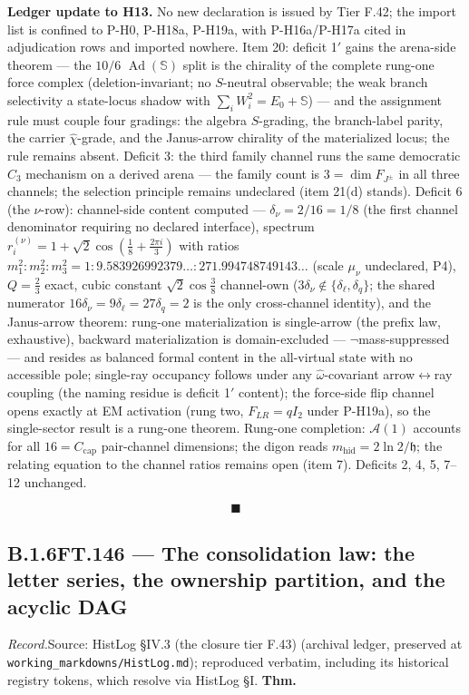 \documentclass[11pt,openany]{report}
\theoremstyle{canonplain}
\theoremstyle{canondef}
\begin{document}
\textbf{Ledger update to H13.} No new declaration is issued by Tier F.42; the import list is confined to P-H0, P-H18a, P-H19a, with P-H16a/P-H17a cited in adjudication rows and imported nowhere. Item 20: deficit 1$'$ gains the arena-side theorem — the $10/6$ $\operatorname{Ad}(\mathbb S)$ split is the chirality of the complete rung-one force complex (deletion-invariant; no $S$-neutral observable; the weak branch selectivity a state-locus shadow with $\sum_iW_i^2=E_0+\mathbb S$) — and the assignment rule must couple four gradings: the algebra $S$-grading, the branch-label parity, the carrier $\hat\chi$-grade, and the Janus-arrow chirality of the materialized locus; the rule remains absent. Deficit 3: the third family channel runs the same democratic $C_3$ mechanism on a derived arena — the family count is $3=\dim F_{J^\pm}$ in all three channels; the selection principle remains undeclared (item 21(d) stands). Deficit 6 (the $\nu$-row): channel-side content computed — $\delta_\nu=2/16=1/8$ (the first channel denominator requiring no declared interface), spectrum $r_i^{(\nu)}=1+\sqrt2\cos(\tfrac18+\tfrac{2\pi i}3)$ with ratios $m_1^2:m_2^2:m_3^2=1:9.583926992379\ldots:271.994748749143\ldots$ (scale $\mu_\nu$ undeclared, P4), $Q=\tfrac23$ exact, cubic constant $\sqrt2\cos\tfrac38$ channel-own ($3\delta_\nu\notin\{\delta_\ell,\delta_q\}$; the shared numerator $16\delta_\nu=9\delta_\ell=27\delta_q=2$ is the only cross-channel identity), and the Janus-arrow theorem: rung-one materialization is single-arrow (the prefix law, exhaustive), backward materialization is domain-excluded — $\neg$mass-suppressed — and resides as balanced formal content in the all-virtual state with no accessible pole; single-ray occupancy follows under any $\hat\omega$-covariant arrow$\leftrightarrow$ray coupling (the naming residue is deficit 1$'$ content); the force-side flip channel opens exactly at EM activation (rung two, $F_{LR}=qI_2$ under P-H19a), so the single-sector result is a rung-one theorem. Rung-one completion: $\mathcal A(1)$ accounts for all $16=C_{\mathrm{cap}}$ pair-channel dimensions; the digon reads $m_{\mathrm{hid}}=2\ln2/\mathfrak h$; the relating equation to the channel ratios remains open (item 7). Deficits 2, 4, 5, 7–12 unchanged.

\[
\blacksquare
\]

\medskip
\subsection*{\texorpdfstring{B.1.6\quad FT.146 — The consolidation law: the letter series, the ownership partition, and the acyclic DAG}{FT.146 B.1.6}}
\label{tag:FT-146}
{\small \textit{Record.}\quad Source: HistLog §IV.3 (the closure tier F.43) (archival ledger, preserved at \texttt{working\_markdowns/HistLog.md}); reproduced verbatim, including its historical registry tokens, which resolve via HistLog \S I.}
\medskip
\textbf{Thm.}
\end{document}
